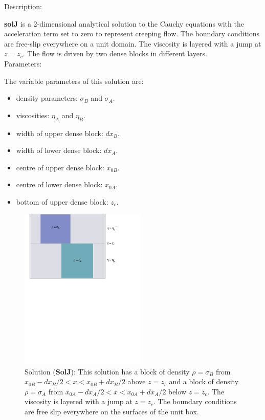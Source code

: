   {\large \fontB Description:}
  
  {\bf solJ} is a 2-dimensional analytical solution to the Cauchy equations with the acceleration term set to zero
  to represent creeping flow. The boundary conditions are free-slip everywhere on a unit domain. 
  The viscosity is layered with a jump at $ z=z_c $.
  The flow is driven by two dense blocks in different layers.
  \\

  {\large \fontB Parameters:}
 
  The variable parameters of this solution are:
  \begin{itemize}
    \item{density parameters: $ \sigma_B $ and $ \sigma_A $.}
    \item{viscosities: $\eta_A$ and $\eta_B$.}
    \item{width of upper dense block: $dx_B$.}
    \item{width of lower dense block: $dx_A$.}
    \item{centre of upper dense block: $x_{0B}$.}
    \item{centre of lower dense block: $x_{0A}$.}
    \item{bottom of upper dense block: $z_c$.}
    \end{itemize}

  \begin{figure}
    \includegraphics[width=6cm,clip]{../figs/figJ.pdf}
    \caption[Short caption]{\label{figJ} 
      Solution ({\bf SolJ}):
      This solution has a block of density $\rho = \sigma_B$ from $x_{0B}-dx_B/2 < x < x_{0B}+dx_B/2$ above
      $ z= z_c$ and a block of density $\rho = \sigma_A$ from $x_{0A}-dx_A/2 < x < x_{0A}+dx_A/2$ below
      $ z= z_c$.
      The viscosity is layered with a jump at $ z=z_c $.
      The boundary conditions are free slip everywhere on the surfaces of the unit box.}
  \end{figure} 
  

